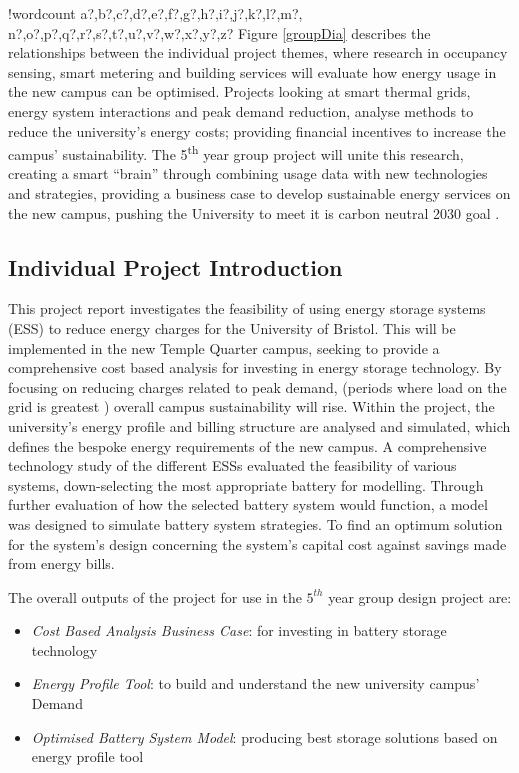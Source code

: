 \documentclass[fontsize=9.5pt]{extarticle}
\numberwithin{figure}{section} %
\providecommand{\tightlist}{%
  \setlength{\itemsep}{0pt}\setlength{\parskip}{0pt}}
\newcounter{words}
\newenvironment{counted}{%
  \setcounter{words}{0}
  \SearchList!{wordcount}{\stepcounter{words}}
    {a?,b?,c?,d?,e?,f?,g?,h?,i?,j?,k?,l?,m?,
    n?,o?,p?,q?,r?,s?,t?,u?,v?,w?,x?,y?,z?}
  \UndoBoundary{'}
  \SearchOrder{p;}}{%
  \StopSearching}
\begin{document}
\begin{counted}
Figure \ref{groupDia} describes the relationships between the individual
project themes, where research in occupancy sensing, smart metering and
building services will evaluate how energy usage in the new campus can
be optimised. Projects looking at smart thermal grids, energy system
interactions and peak demand reduction, analyse methods to reduce the
university's energy costs; providing financial incentives to increase
the campus' sustainability. The 5\textsuperscript{th} year group project
will unite this research, creating a smart ``brain'' \cite{pbmeet}
through combining usage data with new technologies and strategies,
providing a business case to develop sustainable energy services on the
new campus, pushing the University to meet it is carbon neutral 2030
goal \cite{universi93:online}.

\subsection{Individual Project
Introduction}\label{individual-project-introduction}

This project report investigates the feasibility of using energy storage
systems (ESS) to reduce energy charges for the University of Bristol.
This will be implemented in the new Temple Quarter campus, seeking to
provide a comprehensive cost based analysis for investing in energy
storage technology. By focusing on reducing charges related to peak
demand, (periods where load on the grid is greatest
\cite{WhatisPe67:online}) overall campus sustainability will rise.
Within the project, the university's energy profile and billing
structure are analysed and simulated, which defines the bespoke energy
requirements of the new campus. A comprehensive technology study of the
different ESSs evaluated the feasibility of various systems,
down-selecting the most appropriate battery for modelling. Through
further evaluation of how the selected battery system would function, a
model was designed to simulate battery system strategies. To find an
optimum solution for the system's design concerning the system's capital
cost against savings made from energy bills.

The overall outputs of the project for use in the \(5^{th}\) year group
design project are:

\begin{itemize}
\tightlist
\item
  \emph{Cost Based Analysis Business Case}: for investing in battery
  storage technology
\item
  \emph{Energy Profile Tool}: to build and understand the new university
  campus' Demand
\item
  \emph{Optimised Battery System Model}: producing best storage
  solutions based on energy profile tool
\end{itemize}


\end{counted}
\end{document}
